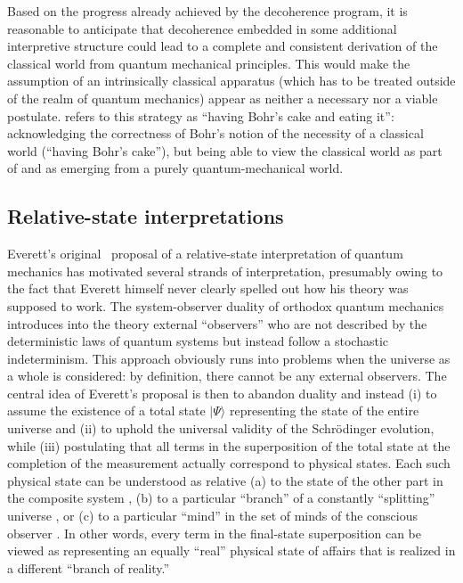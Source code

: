 \documentclass[rmp,aps,amsmath,amsfonts,noshowkeys,noshowpacs,12pt]{revtex4}
\newcommand{\ket}[1]{\ensuremath{|{#1\rangle}}}
\begin{document}
Based on the progress already achieved by the decoherence program, it
is reasonable to anticipate that decoherence embedded in some
additional interpretive structure could lead to a complete and
consistent derivation of the classical world from quantum mechanical
principles. This would make the assumption of an intrinsically
classical apparatus (which has to be treated outside of the realm of
quantum mechanics) appear as neither a necessary nor a viable
postulate. \citet[p.~22]{Bacciagaluppi:2003:az} refers to this
strategy as ``having Bohr's cake and eating it'': acknowledging the
correctness of Bohr's notion of the necessity of a classical world
(``having Bohr's cake''), but being able to view the classical world
as part of and as emerging from a purely quantum-mechanical world.


\subsection{Relative-state interpretations \label{sec:everett}}

Everett's original~\citeyearpar{Everett:1957:rw} proposal of a
relative-state interpretation of quantum mechanics has motivated
several strands of interpretation, presumably owing to the fact that
Everett himself never clearly spelled out how his theory was supposed
to work. The system-observer duality of orthodox quantum mechanics
introduces into the theory external ``observers'' who are not
described by the deterministic laws of quantum systems but instead
follow a stochastic indeterminism. This approach obviously runs into
problems when the universe as a whole is considered: by definition,
there cannot be any external observers. The central idea of Everett's
proposal is then to abandon duality and instead (i) to assume the
existence of a total state $\ket{\Psi}$ representing the state of the
entire universe and (ii) to uphold the universal validity of the
Schr\"odinger evolution, while (iii) postulating that all terms in the
superposition of the total state at the completion of the measurement
actually correspond to physical states. Each such physical state can
be understood as relative (a) to the state of the other part in the
composite system \citep[as in Everett's original proposal; also
see][]{Rovelli:1996:rq,Mermin:1998:ii}, (b) to a particular ``branch''
of a constantly ``splitting'' universe \citetext{the {\em many-worlds
    interpretations}, popularized by \citealp{DeWitt:1970:pl} and
  \citealp{Deutsch:1985:rx}}, or (c) to a particular ``mind'' in the
set of minds of the conscious observer \citep[the {\em many-minds
  interpretation}; see, for example,][]{Lockwood:1996:pu}. In other
words, every term in the final-state superposition can be viewed as
representing an equally ``real'' physical state of affairs that is
realized in a different ``branch of reality.''
\end{document}
